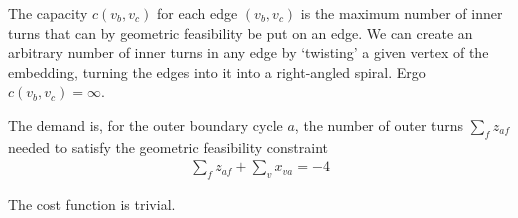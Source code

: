 The capacity $c(v_b, v_c)$ for each edge $(v_b, v_c)$ is the maximum number of
inner turns that can by geometric feasibility be put on an edge. We can create
an arbitrary number of inner turns in any edge by `twisting' a given vertex
of the embedding, turning the edges into it into a right-angled spiral. Ergo
$c(v_b, v_c) = \infty$.

The demand is, for the outer boundary cycle $a$, the number of outer turns $\sum_f z_{af}$ needed to
satisfy the geometric feasibility constraint
\begin{align*}
  \sum_f z_{af} + \sum_v x_{va} = -4
\end{align*}

The cost function is trivial.
